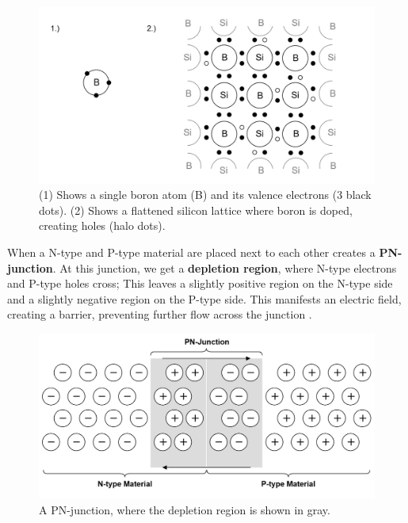 \vspace{-1em}
\begin{figure}[ht!]
  \centering
  \includegraphics[width=\textwidth]{Sections/circuits/p-type.png}
  \caption{(1) Shows a single boron atom (B) and its valence electrons (3 black dots).
  (2) Shows a flattened silicon lattice where boron is doped, creating holes (halo dots). }
  \label{fig:doping3}
\end{figure}

\newpage 

\begin{Def}

    \label{def:n_p_junctions}

   When a N-type and P-type material are placed next to each other 
   creates a \textbf{PN-junction}. At this junction, we get a \textbf{depletion region},
   where N-type electrons and P-type holes cross; This leaves a 
   slightly positive region on the N-type side and a slightly negative region on the P-type side.
   This manifests an electric field, creating a barrier, preventing further flow across the junction \cite{engineermindset2024mosfet}.
\end{Def}

\vspace{-1.5em}
\noindent
\begin{figure}[ht!]
  \centering
  \includegraphics[width=\textwidth]{Sections/circuits/pn-junction.png}
  \caption{A PN-junction, where the depletion region is shown in gray.}
  \label{fig:pn-junction}
\end{figure}


